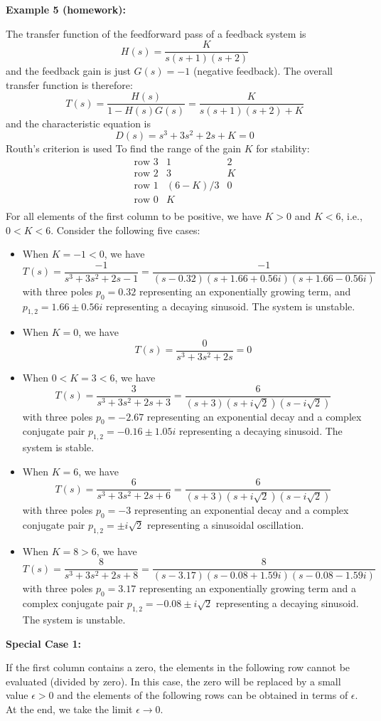 \documentclass[12pt]{article}
\begin{document}
{\bf Example 5 (homework):}

The transfer function of the feedforward pass of a feedback system is 
\[ H(s)=\frac{K}{s(s+1)(s+2)} \]
and the feedback gain is just $G(s)=-1$ (negative feedback). The overall transfer 
function is therefore:
\[ T(s)=\frac{H(s)}{1-H(s)G(s)}=\frac{K}{s(s+1)(s+2)+K} \]
and the characteristic equation is
\[ D(s)=s^3+3s^2+2s+K=0 \]
Routh's criterion is used To find the range of the gain $K$ for stability:
\[ \begin{array}{rrr}
\mbox{row 3} & 1 & 2 \\
\mbox{row 2} & 3 & K \\
\mbox{row 1} & (6-K)/3 & 0 \\
\mbox{row 0} & K &  \\
\end{array} \]
For all elements of the first column to be positive, we have $K>0$ and $K<6$, i.e.,
$0<K<6$. Consider the following five cases:
\begin{itemize}
\item When $K=-1<0$, we have
\[ T(s)=\frac{-1}{s^3+3s^2+2s-1}=\frac{-1}{(s-0.32)(s+1.66+0.56i)(s+1.66-0.56i)}\]
with three poles $p_0=0.32$ representing an exponentially growing term, and
$p_{1,2}=1.66\pm 0.56i$ representing a decaying sinusoid. The system is unstable.
\item When $K=0$, we have
\[ T(s)=\frac{0}{s^3+3s^2+2s}=0 \]
\item When $0<K=3<6$, we have
\[ T(s)=\frac{3}{s^3+3s^2+2s+3}=\frac{6}{(s+3)(s+i\sqrt{2})(s-i\sqrt{2})} \]
with three poles $p_0=-2.67$ representing an exponential decay and a complex conjugate
pair $p_{1,2}=-0.16\pm 1.05i$ representing a decaying sinusoid. The system is stable.
\item When $K=6$, we have
\[ T(s)=\frac{6}{s^3+3s^2+2s+6}=\frac{6}{(s+3)(s+i\sqrt{2})(s-i\sqrt{2})} \]
with three poles $p_0=-3$ representing an exponential decay and a complex conjugate
pair $p_{1,2}=\pm i\sqrt{2}$ representing a sinusoidal oscillation.
\item When $K=8>6$, we have
\[ T(s)=\frac{8}{s^3+3s^2+2s+8}=\frac{8}{(s-3.17)(s-0.08+1.59i)(s-0.08-1.59i)} \]
with three poles $p_0=3.17$ representing an exponentially growing term and a complex 
conjugate pair $p_{1,2}=-0.08 \pm i\sqrt{2}$ representing a decaying sinusoid. The 
system is unstable.
\end{itemize}


{\bf Special Case 1:}

If the first column contains a zero, the elements in the following row cannot be
evaluated (divided by zero). In this case, the zero will be replaced by a small
value $\epsilon>0$ and the elements of the following rows can be obtained in 
terms of $\epsilon$. At the end, we take the limit $\epsilon\rightarrow 0$.
\end{document}
